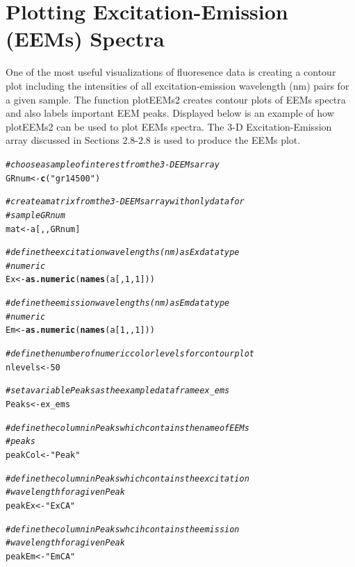 \documentclass[a4paper,11pt]{article}\usepackage[]{graphicx}\usepackage[]{color}
\makeatletter
\newcommand{\hlnum}[1]{\textcolor[rgb]{0.686,0.059,0.569}{#1}}%
\newcommand{\hlstr}[1]{\textcolor[rgb]{0.192,0.494,0.8}{#1}}%
\newcommand{\hlcom}[1]{\textcolor[rgb]{0.678,0.584,0.686}{\textit{#1}}}%
\newcommand{\hlstd}[1]{\textcolor[rgb]{0.345,0.345,0.345}{#1}}%
\newcommand{\hlkwb}[1]{\textcolor[rgb]{0.69,0.353,0.396}{#1}}%
\newcommand{\hlkwd}[1]{\textcolor[rgb]{0.737,0.353,0.396}{\textbf{#1}}}%
\newenvironment{kframe}{%
 \def\at@end@of@kframe{}%
 \ifinner\ifhmode%
  \def\at@end@of@kframe{\end{minipage}}%
  \begin{minipage}{\columnwidth}%
 \fi\fi%
 \def\FrameCommand##1{\hskip\@totalleftmargin \hskip-\fboxsep
 \colorbox{shadecolor}{##1}\hskip-\fboxsep
     \hskip-\linewidth \hskip-\@totalleftmargin \hskip\columnwidth}%
 \MakeFramed {\advance\hsize-\width
   \@totalleftmargin\z@ \linewidth\hsize
   \@setminipage}}%
 {\par\unskip\endMakeFramed%
 \at@end@of@kframe}
\newenvironment{knitrout}{}{} %
\makeatother
\begin{document}
\section{Plotting Excitation-Emission (EEMs) Spectra}
One of the most useful visualizations of fluoresence data is creating a contour plot including the intensities of all excitation-emission wavelength (nm) pairs for a given sample. The function plotEEMs2 creates contour plots of EEMs spectra and also labels important EEM peaks. Displayed below is an example of how plotEEMs2 can be used to plot EEMs spectra. The 3-D Excitation-Emission array discussed in Sections 2.8-2.8 is used to produce the EEMs plot.

\begin{knitrout}
\color{fgcolor}\begin{kframe}
\begin{alltt}
\hlcom{# choose a sample of interest from the 3-D EEMs array}
\hlstd{GRnum} \hlkwb{<-} \hlkwd{c}\hlstd{(}\hlstr{"gr14500"}\hlstd{)}

\hlcom{# create a matrix from the 3-D EEMs array with only data for}
\hlcom{# sample GRnum}
\hlstd{mat} \hlkwb{<-} \hlstd{a[, , GRnum]}

\hlcom{# define the excitation wavelengths (nm) as Ex data type}
\hlcom{# numeric}
\hlstd{Ex} \hlkwb{<-} \hlkwd{as.numeric}\hlstd{(}\hlkwd{names}\hlstd{(a[,} \hlnum{1}\hlstd{,} \hlnum{1}\hlstd{]))}

\hlcom{# define the emission wavelengths (nm) as Em data type}
\hlcom{# numeric}
\hlstd{Em} \hlkwb{<-} \hlkwd{as.numeric}\hlstd{(}\hlkwd{names}\hlstd{(a[}\hlnum{1}\hlstd{, ,} \hlnum{1}\hlstd{]))}

\hlcom{# define the number of numeric color levels for contour plot}
\hlstd{nlevels} \hlkwb{<-} \hlnum{50}

\hlcom{# set a variable Peaks as the example dataframe ex_ems}
\hlstd{Peaks} \hlkwb{<-} \hlstd{ex_ems}

\hlcom{# define the column in Peaks which contains the name of EEMs}
\hlcom{# peaks}
\hlstd{peakCol} \hlkwb{<-} \hlstr{"Peak"}

\hlcom{# define the column in Peaks which contains the excitation}
\hlcom{# wavelength for a given Peak}
\hlstd{peakEx} \hlkwb{<-} \hlstr{"ExCA"}

\hlcom{# define the column in Peaks whcih contains the emission}
\hlcom{# wavelength for a given Peak}
\hlstd{peakEm} \hlkwb{<-} \hlstr{"EmCA"}


\end{alltt}
\end{kframe}
\end{knitrout}
\end{document}
